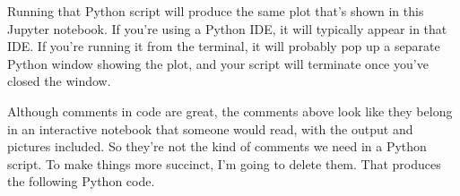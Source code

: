 \documentclass[letterpaper,10pt,english]{sphinxmanual}
\begin{document}
\begin{sphinxVerbatim}[commandchars=\\\{\}]


   
  \PYG{p}{[}      \PYG{p}{]}
   





     
\end{sphinxVerbatim}

Running that Python script will produce the same plot that’s shown in this Jupyter notebook.  If you’re using a Python IDE, it will typically appear in that IDE.  If you’re running it from the terminal, it will probably pop up a separate Python window showing the plot, and your script will terminate once you’ve closed the window.

Although comments in code are great, the comments above look like they belong in an interactive notebook that someone would read, with the output and pictures included.  So they’re not the kind of comments we need in a Python script.  To make things more succinct, I’m going to delete them.  That produces the following Python code.

\begin{sphinxVerbatim}[commandchars=\\\{\}]
   
  

  
       


   
  \PYG{p}{[}      \PYG{p}{]}
   

     
\end{sphinxVerbatim}
\end{document}
